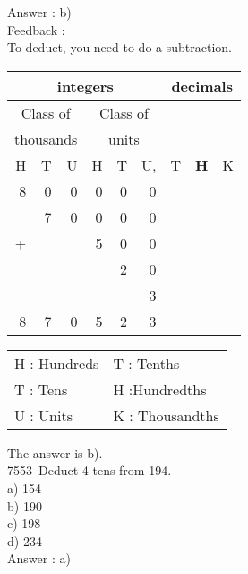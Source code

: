 \documentclass[letterpaper, 12pt]{article}
\begin{document}
Answer : b)\\

Feedback :\\
To deduct, you need to do a subtraction.
\begin{center}
\begin{tabular}{|rrr|rrr|rrr|}
\hline
\multicolumn{6}{|c|}{integers} &\multicolumn{3}{|c|}{decimals} \\
\hline
\multicolumn{3}{|c|}{Class of} &\multicolumn{3}{|c|}{Class of} &  \multicolumn{3}{c|}{} \\
\multicolumn{3}{|c|}{thousands} &\multicolumn{3}{|c|}{units} &  \multicolumn{3}{c|}{} \\
\hline
H & T & U &H & T & U, & T\up{th} & \textbf{H\up{th}} & K\up{th} \\
\hline
\hline
8 & 0 & 0 & 0 & 0 & 0 &  & &\\
 & 7 & 0 & 0 & 0 & 0 &  & &\\
+ &  &  & 5 & 0 & 0 &  & &\\
 &  &  &  & 2 & 0 &  & &\\
 &  &  &  &  & 3 &  & &\\
\hline
\hline
 8 & 7 & 0 & 5 & 2 & 3 &  & &
\\
\hline
\end{tabular}
\end{center}

\scriptsize
\begin{center}
\begin{tabular}{ll}
H : Hundreds & T\up{th} : Tenths\\
T : Tens & H\up{th} :Hundredths\\
U : Units & K\up{e} : Thousandths\\
\end{tabular}
\end{center}

\normalsize
The answer is b).\\





7553--Deduct 4 tens from 194.\\

a) 154\\
b) 190\\
c) 198\\
d) 234\\

Answer : a)\\
\end{document}
